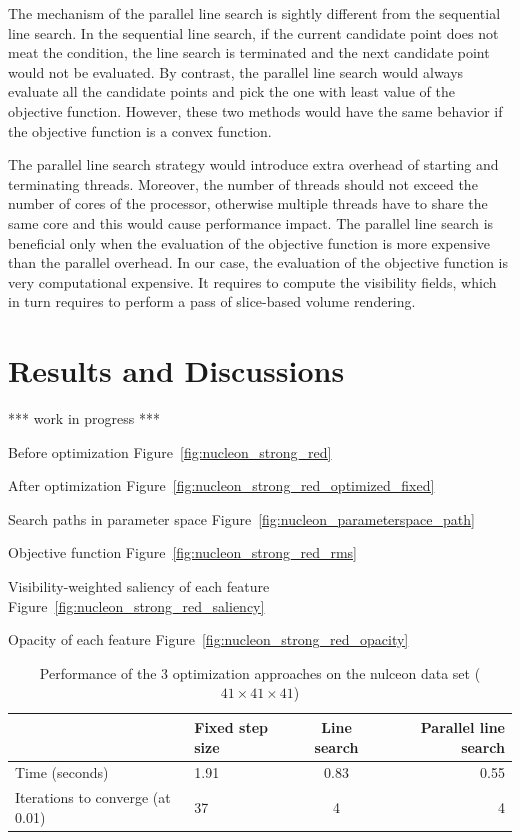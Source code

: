 The mechanism of the parallel line search is sightly different from the sequential line search. In the sequential line search, if the current candidate point does not meat the condition, the line search is terminated and the next candidate point would not be evaluated. By contrast, the parallel line search would always evaluate all the candidate points and pick the one with least value of the objective function. However, these two methods would have the same behavior if the objective function is a convex function.

The parallel line search strategy would introduce extra overhead of starting and terminating threads. Moreover, the number of threads should not exceed the number of cores of the processor, otherwise multiple threads have to share the same core and this would cause performance impact. The parallel line search is beneficial only when the evaluation of the objective function is more expensive than the parallel overhead.
In our case, the evaluation of the objective function is very computational expensive. It requires to compute the visibility fields, which in turn requires to perform a pass of slice-based volume rendering.

\section{Results and Discussions}

*** work in progress ***

Before optimization
Figure~\ref{fig:nucleon_strong_red}

After optimization
Figure~\ref{fig:nucleon_strong_red_optimized_fixed}

Search paths in parameter space
Figure~\ref{fig:nucleon_parameterspace_path}

Objective function
Figure~\ref{fig:nucleon_strong_red_rms}

Visibility-weighted saliency of each feature
Figure~\ref{fig:nucleon_strong_red_saliency}

Opacity of each feature
Figure~\ref{fig:nucleon_strong_red_opacity}

\begin{table}[h]
\begin{tabular}{ l | l c r }
	& Fixed step size & Line search & Parallel line search \\
	\hline
	Time (seconds) & 1.91 & 0.83 & 0.55 \\
	Iterations to converge (at 0.01) & 37 & 4 & 4 \\
\end{tabular}
\caption[Table caption text]{Performance of the 3 optimization approaches on the nulceon data set ($ 41 \times 41 \times 41 $)}
\label{table:nucleon_table}
\end{table}

